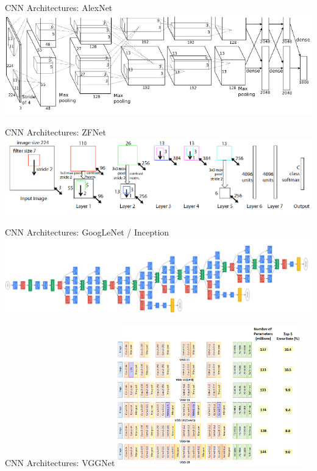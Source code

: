 \begin{frame}{CNN Architectures: AlexNet}
	\centering
	\includegraphics[width=\textwidth]{../Images/CNNArchitectures/AlexNet.png}\\
\end{frame}

\begin{frame}{CNN Architectures: ZFNet}
	\centering
	\includegraphics[width=\textwidth]{../Images/CNNArchitectures/ZFNet.png}\\
\end{frame}

\begin{frame}{CNN Architectures: GoogLeNet / Inception}
	\centering
	\includegraphics[width=\textwidth]{../Images/CNNArchitectures/GoogLeNet.png}\\
\end{frame}

\begin{frame}{CNN Architectures: VGGNet}
	\centering
	\includegraphics[width=0.6\textwidth]{../Images/CNNArchitectures/VGGNet.png}\\
\end{frame}

